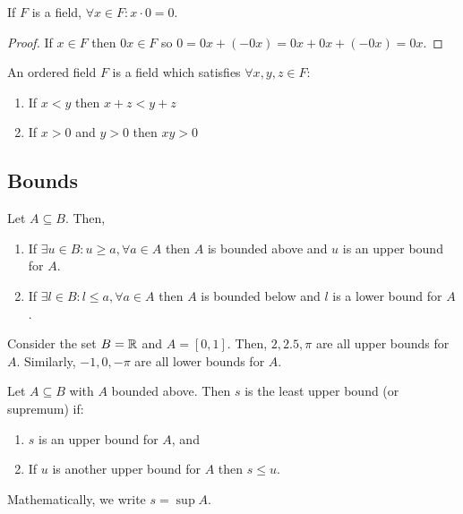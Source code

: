 \begin{theorem}
    If $F$ is a field, $\forall x \in F: x \cdot 0 = 0$.
\end{theorem}

\begin{proof}
    If $x \in F$ then $0x \in F$ so $0 = 0x + (-0x) = 0x + 0x + (-0x) = 0x$.
\end{proof}

\begin{definition}
    An ordered field $F$ is a field which satisfies $\forall x, y, z \in F$:
    \begin{enumerate}
        \item If $x < y$ then $x + z < y + z$
        \item If $x > 0$ and $y > 0$ then $xy > 0$ 
    \end{enumerate}
\end{definition}

\subsection{Bounds}

\begin{definition}[Bounds]
    Let $A \subseteq B$. Then,
    \begin{enumerate}
        \item If $\exists u \in B: u \geq a, \forall a \in A$ then $A$ is bounded above and $u$ is an upper bound for $A$.
        \item If $\exists l \in B: l \leq a, \forall a \in A$ then $A$ is bounded below and $l$ is a lower bound for $A$.
    \end{enumerate}
\end{definition}

\begin{eg}
    Consider the set $B = \mathbb{R}$ and $A = [0,1]$. Then, $2, 2.5, \pi$ are all upper bounds for $A$. Similarly, $-1, 0, -\pi$ are all lower bounds for $A$.      
\end{eg}

\begin{definition}[Supremum]
    Let $A \subseteq B$ with $A$ bounded above. Then $s$ is the least upper bound (or supremum) if:
    \begin{enumerate}
        \item $s$ is an upper bound for $A$, and
        \item If $u$ is another upper bound for $A$ then $s \leq u$.
    \end{enumerate}
    Mathematically, we write $s = \sup A$.
\end{definition}

